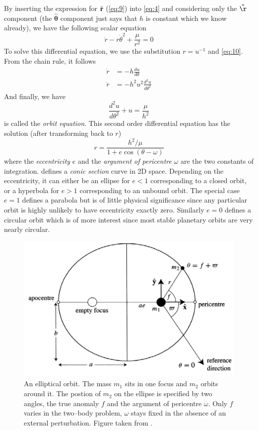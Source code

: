 By inserting the expression for $\ddot{\boldsymbol{\mathbf{r}}}$ (\cref{eq:9}) into \cref{eq:4} 
and considering only the $\vect{\hat\r}$ component (the $\boldsymbol{\hat\theta}$
component just says that $h$ is constant which we know already), we have the following
scalar equation
\begin{equation}
\ddot{r}-r\dot{\theta}^2 + \frac{\mu}{r^2} =0
\end{equation}
To solve this differential equation, we use the substitution $r=u^{-1}$ and
\cref{eq:10}. From the chain rule, it follows
\begin{align}
    \dot{r}&=-h \frac{du}{d\theta} \\
    \ddot{r}&=-h^2u^2 \frac{d^2u}{d\theta^2} 
\end{align}
And finally, we have
\begin{equation}
    \frac{d^2u}{d\theta^2} +u= \frac{\mu}{h^2} 
    \label{eq:orbit_eq}
\end{equation}
 is called the \emph{orbit equation}. This second order 
differential equation has the solution (after transforming back to $r$)
\begin{equation}
    r = \frac{h^2/\mu}{1 + e\cos (\theta-\omega)} 
    \label{eq:orbit_eq_solution}
\end{equation}
where the \emph{eccentricity} $e$ and the \emph{argument of pericentre} $\omega$
are the two constants of integration.  defines 
a \emph{conic section} curve in 2D space. Depending on the eccentricity,
it can either be an ellipse for $e<1$ corresponding to a closed orbit, or
a hyperbola for $e>1$ corresponding to an unbound orbit. The special case
$e=1$ defines a parabola but is of little physical significance since any
particular orbit is highly unlikely to have eccentricity exactly zero. 
Similarly $e=0$ defines a circular orbit which is of more interest since
most stable planetary orbits are very nearly circular.
\begin{figure}[htb]
\centering
\includegraphics[width=\linewidth]{gfx/ellipse.png}
\caption{An elliptical orbit. The mass $m_1$ sits in one focus and $m_2$ orbits 
    around it. The postion of $m_2$ on the ellipse is specified by two angles, 
    the true anomaly $f$ and the argument of pericentre $\omega$. Only $f$ 
    varies in the two--body problem, $\omega$ stays fixed in the absence of an
    external perturbation. Figure taken from \citet{murray}.}
\label{fig:ellipse}
\end{figure}
